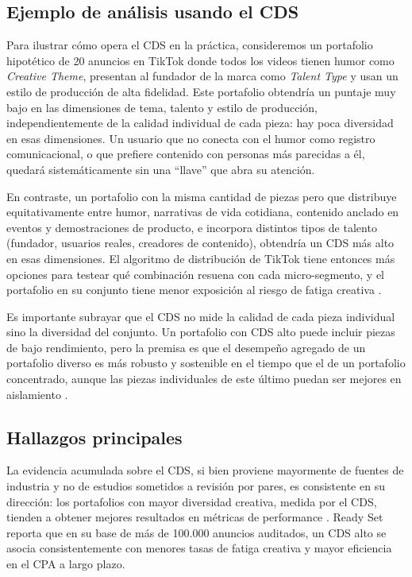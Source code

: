 \documentclass[12pt, a4paper]{report}
\begin{document}
\subsection{Ejemplo de análisis usando el CDS}

Para ilustrar cómo opera el CDS en la práctica, consideremos un portafolio hipotético de 20 anuncios
en TikTok donde todos los videos tienen humor como \textit{Creative Theme}, presentan al fundador de
la marca como \textit{Talent Type} y usan un estilo de producción de alta fidelidad. Este portafolio
obtendría un puntaje muy bajo en las dimensiones de tema, talento y estilo de producción,
independientemente de la calidad individual de cada pieza: hay poca diversidad en esas dimensiones.
Un usuario que no conecta con el humor como registro comunicacional, o que prefiere contenido con
personas más parecidas a él, quedará sistemáticamente sin una ``llave'' que abra su atención.

En contraste, un portafolio con la misma cantidad de piezas pero que distribuye equitativamente entre
humor, narrativas de vida cotidiana, contenido anclado en eventos y demostraciones de producto, e
incorpora distintos tipos de talento (fundador, usuarios reales, creadores de contenido), obtendría
un CDS más alto en esas dimensiones. El algoritmo de distribución de TikTok tiene entonces más
opciones para testear qué combinación resuena con cada micro-segmento, y el portafolio en su conjunto
tiene menor exposición al riesgo de fatiga creativa \citep{readyset2025}.

Es importante subrayar que el CDS no mide la calidad de cada pieza individual sino la diversidad del
conjunto. Un portafolio con CDS alto puede incluir piezas de bajo rendimiento, pero la premisa es que el
desempeño agregado de un portafolio diverso es más robusto y sostenible en el tiempo que el de un
portafolio concentrado, aunque las piezas individuales de este último puedan ser mejores en aislamiento
\citep{meta2024a}.

\subsection{Hallazgos principales}

La evidencia acumulada sobre el CDS, si bien proviene mayormente de fuentes de industria y no de
estudios sometidos a revisión por pares, es consistente en su dirección: los portafolios con mayor
diversidad creativa, medida por el CDS, tienden a obtener mejores resultados en métricas de performance
\citep{readyset2025}. Ready Set reporta que en su base de más de 100.000 anuncios auditados, un CDS
alto se asocia consistentemente con menores tasas de fatiga creativa y mayor eficiencia en el CPA
a largo plazo.
\end{document}

